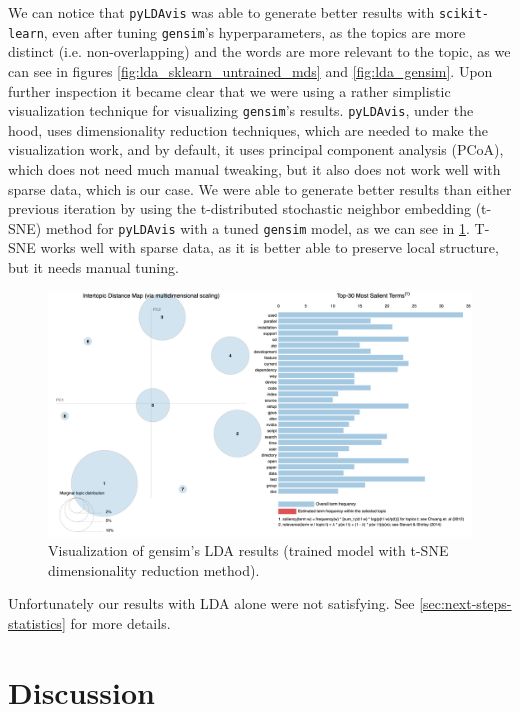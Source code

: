 \documentclass[11pt, conference, onecolumn, final]{IEEEtran}
\begin{document}
We can notice that \verb|pyLDAvis| was able to generate better results with
\verb|scikit-learn|, even after tuning \verb|gensim|'s hyperparameters, as the
topics are more distinct (i.e. non-overlapping) and the words are more relevant
to the topic, as we can see in figures
\ref{fig:lda_sklearn_untrained_mds} and \ref{fig:lda_gensim}.
Upon further inspection it became clear that we were using a rather simplistic
visualization technique for visualizing \verb|gensim|'s results.
\verb|pyLDAvis|, under the hood, uses dimensionality reduction techniques,
which are needed to make the visualization work, and by default, it uses
principal component analysis (PCoA), which does not need much manual tweaking,
but it also does not work well with sparse data, which is our case.
We were able to generate better results than either previous iteration by using
the t-distributed stochastic neighbor embedding (t-SNE) method for
\verb|pyLDAvis| with a tuned \verb|gensim| model, as we can see in
\cref{fig:lda_gensim_tsne}.
T-SNE works well with sparse data, as it is better able to preserve local
structure, but it needs manual tuning.

\begin{figure}[H]
    \centering
    \includegraphics[width=\linewidth]{gensim-tsne.png}
    \caption{Visualization of gensim's LDA results (trained model with t-SNE
        dimensionality reduction method).}
    \label{fig:lda_gensim_tsne}
\end{figure}

Unfortunately our results with LDA alone were not satisfying.
See \cref{sec:next-steps-statistics} for more details.

\section{Discussion} \label{sec:discussion}
\end{document}
